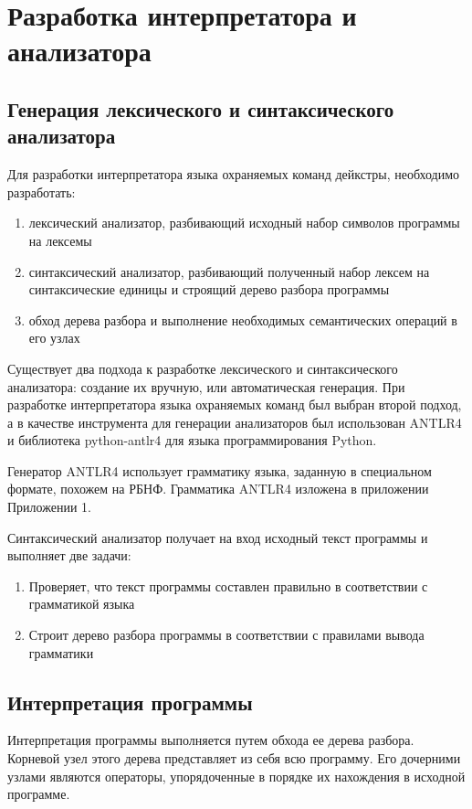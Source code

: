 \chapter{Разработка интерпретатора и анализатора} \label{ch3}

\section{Генерация лексического и синтаксического анализатора}
Для разработки интерпретатора языка охраняемых команд дейкстры, необходимо разработать:
\begin{enumerate}
    \item лексический анализатор, разбивающий исходный набор символов программы на лексемы
    \item синтаксический анализатор, разбивающий полученный набор лексем на синтаксические единицы и строящий
    дерево разбора программы
    \item обход дерева разбора и выполнение необходимых семантических операций в его узлах
\end{enumerate}

Существует два подхода к разработке лексического и синтаксического анализатора: создание их вручную,
или автоматическая генерация. При разработке интерпретатора языка охраняемых команд был выбран второй подход,
а в качестве инструмента для генерации анализаторов был использован ANTLR4\cite{Antlr} и библиотека python-antlr4\cite{AntlrPython} для языка
программирования Python.

Генератор ANTLR4 использует грамматику языка, заданную в специальном формате, похожем на РБНФ.
Грамматика ANTLR4 изложена в приложении Приложении 1.

Синтаксический анализатор получает на вход исходный текст программы и выполняет две задачи:
\begin{enumerate}
    \item Проверяет, что текст программы составлен правильно в соответствии с грамматикой языка
    \item Строит дерево разбора программы в соответствии с правилами вывода грамматики
\end{enumerate}

\section{Интерпретация программы}
Интерпретация программы выполняется путем обхода ее дерева разбора. Корневой узел этого дерева
представляет из себя всю программу. Его дочерними узлами являются операторы, упорядоченные 
в порядке их нахождения в исходной программе.


